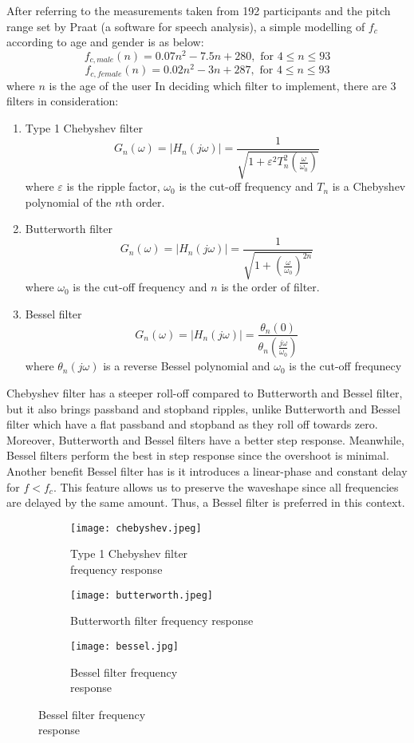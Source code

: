 After referring to the measurements taken from 192 participants and the pitch range
set by Praat (a software for speech analysis), a simple modelling of $f_c$ according to age and gender
is as below:
\[f_{c,male}(n) = 0.07n^2 - 7.5n + 280, \text{ for } 4 \leq n\leq 93 \label{male} \] 
\[f_{c,female}(n) = 0.02n^2 - 3n + 287, \text{ for } 4 \leq n \leq 93 \label{female} \] 
where $n$ is the age of the user
In deciding which filter to implement, there are 3 filters in consideration:
\begin{enumerate}[label=(\alph*)]
	\item Type 1 Chebyshev filter
	\[G_{n}(\omega) = |H_{n}(j\omega)| = {\frac{1}{\sqrt{1+\varepsilon^{2} T_{n}^{2}(\frac{\omega}{\omega_{0}})}}}\]
	where $\varepsilon$  is the ripple factor, $\omega _{0}$ is the cut-off frequency
	and $T_{n}$ is a Chebyshev polynomial of the $n$th order.
	\item Butterworth filter
	\[G_{n}(\omega) = |H_{n}(j\omega)| = {\frac{1}{\sqrt{1+(\frac{\omega}{\omega_{0}})^{2n}}}}\]
	where $\omega _{0}$ is the cut-off frequency and $n$ is the order of filter.
	\item Bessel filter
	\[G_{n}(\omega) = |H_{n}(j\omega)| ={\frac {\theta _{n}(0)}{\theta _{n}(\frac{j\omega}{\omega _{0}})}}\]
	where $\theta _{n}(j\omega)$ is a reverse Bessel polynomial and $\omega _{0}$ is the cut-off frequnecy
\end{enumerate}

Chebyshev filter has a steeper roll-off compared to Butterworth and Bessel filter, but it also brings passband and stopband ripples, 
unlike Butterworth and Bessel filter which have a flat passband and stopband as they roll off towards zero. Moreover, Butterworth 
and Bessel filters have a better step response. Meanwhile, Bessel filters perform the best in step response since the overshoot is
minimal. Another benefit Bessel filter has is it introduces a linear-phase and constant delay for $f<f_c$. This
feature allows us to preserve the waveshape since all frequencies are delayed by the same amount.
Thus, a Bessel filter is preferred in this context.

\begin{figure}[h]
	\centering
	\begin{subfigure}{.4\textwidth}
	  	\centering
	  	\texttt{[image: chebyshev.jpeg]}
	  	\caption{Type 1 Chebyshev filter \\frequency response}
	  	\label{fig:sub1}
	\end{subfigure}
	\hfill
	\begin{subfigure}{.4\textwidth}
	  	\centering
	  	\texttt{[image: butterworth.jpeg]}
	  	\caption{Butterworth filter frequency response}
	  	\label{fig:sub2}
	\end{subfigure}
	\hfill
	\begin{subfigure}{.4\textwidth}
		\centering
		\texttt{[image: bessel.jpg]}
		\caption{Bessel filter frequency\\response}
		\label{fig:sub3}
	\end{subfigure}

\end{figure}

